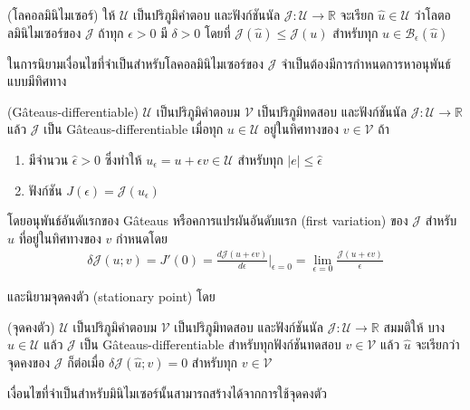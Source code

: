 \begin{Definition}
    (โลคอลมินิไมเซอร์) ให้ $\mathcal{U}$ เป็นปริภูมิคำตอบ และฟังก์ชันนัล $\mathcal{J} : \mathcal{U} \rightarrow \mathbb{R} $ จะเรียก $\hat{u} \in \mathcal{U}$ ว่าโลตอลมินิไมเซอร์ของ $\mathcal{J}$ ถ้าทุก $\epsilon > 0 $ มี $\delta > 0$ โดยที่ $\mathcal{J}(\hat{u}) \leq \mathcal{J}(u)$ สำหรับทุก $u \in \mathcal{B}_{\epsilon}(\hat{u})$ 
\end{Definition}

ในการนิยามเงื่อนไขที่จำเป็นสำหรับโลคอลมินิไมเซอร์ของ $\mathcal{J}$ จำเป็นต้องมีการกำหนดการหาอนุพันธ์แบบมีทิศทาง

\begin{Definition}
    (G\^{a}teaus-differentiable)
    $\mathcal{U}$ เป็นปริภูมิคำตอบม $\mathcal{V}$ เป็นปริภูมิทดสอบ และฟังก์ชันนัล $\mathcal{J} : \mathcal{U} \rightarrow \mathbb{R}$ แล้ว $\mathcal{J}$ เป็น G\^{a}teaus-differentiable เมื่อทุก $u \in \mathcal{U}$ อยู่ในทิศทางของ $v \in \mathcal{V}$ ถ้า
    \begin{enumerate}
        \item มีจำนวน $\hat{\epsilon} > 0$ ซึ่งทำให้ $u_{\epsilon} = u + \epsilon v \in \mathcal{U}$ สำหรับทุก $|e| \leq \hat{\epsilon}$
        \item ฟังก์ชัน $J(\epsilon) = \mathcal{J}(u_\epsilon)$
    \end{enumerate}
    โดยอนุพันธ์อันดัแรกของ G\^{a}teaus หรือคการแปรผันอันดับแรก (first variation) ของ $\mathcal{J}$ สำหรับ $u$ ที่อยู่ในทิศทางของ $v$ กำหนดโดย
    \begin{align*}
        \delta \mathcal{J}(u;v) = J'(0) = \frac{d\mathcal{J}(u + \epsilon v)}{d \epsilon} \Big|_{\epsilon = 0} = \lim_{\epsilon = 0}\frac{\mathcal{J}(u + \epsilon v)}{\epsilon} 
    \end{align*}
\end{Definition}

และนิยามจุดคงตัว (stationary point) โดย

\begin{Definition}
(จุดคงตัว) $\mathcal{U}$ เป็นปริภูมิคำตอบม $\mathcal{V}$ เป็นปริภูมิทดสอบ และฟังก์ชันนัล $\mathcal{J} : \mathcal{U} \rightarrow \mathbb{R}$ สมมติให้ บาง $\hat{u} \in \mathcal{U}$ แล้ว $\mathcal{J}$ เป็น G\^{a}teaus-differentiable สำหรับทุกฟังก์ชันทดสอบ $v \in \mathcal{V}$ แล้ว $\hat{u}$ จะเรียกว่าจุดคงของ $\mathcal{J}$ ก็ต่อเมื่อ $\delta\mathcal{J}(\hat{u};v) = 0$ สำหรับทุก $v \in \mathcal{V}$
\end{Definition}

เงื่อนไขที่จำเป็นสำหรับมินิไมเซอร์นั้นสามารถสร้างได้จากการใช้จุดคงตัว

